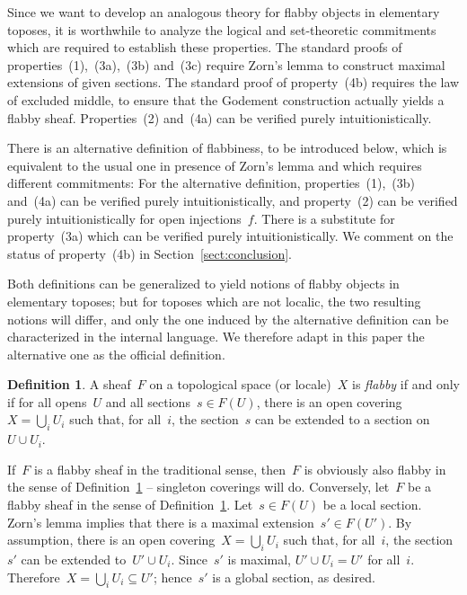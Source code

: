 \documentclass[oneside]{amsart}
\theoremstyle{definition}
\newtheorem{defn}{Definition}[section]
\theoremstyle{plain}
\theoremstyle{remark}
\renewcommand{\_}{\mathpunct{.}\,}
\begin{document}
Since we want to develop an analogous theory for flabby objects in elementary
toposes, it is worthwhile to analyze the logical and set-theoretic commitments
which are required to establish these properties. The standard proofs of
properties~(1),~(3a),~(3b) and~(3c) require Zorn's lemma to construct maximal
extensions of given sections. The standard proof of property~(4b) requires the
law of excluded middle, to ensure that the Godement construction actually
yields a flabby sheaf. Properties~(2) and~(4a) can be verified purely
intuitionistically.

There is an alternative definition of flabbiness, to be introduced below, which
is equivalent to the usual one in presence of Zorn's lemma and which
requires different commitments: For the alternative definition,
properties~(1),~(3b) and~(4a) can be verified purely intuitionistically, and
property~(2) can be verified purely intuitionistically for open injections~$f$.
There is a substitute for property~(3a) which can be verified purely
intuitionistically. We comment on the status of property~(4b) in
Section~\ref{sect:conclusion}.

Both definitions can be generalized to yield notions of flabby objects in
elementary toposes; but for toposes which are not localic, the two resulting
notions will differ, and only the one induced by the alternative definition
can be characterized in the internal language. We therefore adapt in this paper the
alternative one as the official definition.

\begin{defn}\label{defn:flabby-sheaf}
A sheaf~$F$ on a topological space (or locale)~$X$ is \emph{flabby}
if and only if for all opens~$U$ and all sections~$s \in F(U)$, there is an
open covering~$X = \bigcup_i U_i$ such that, for all~$i$, the section~$s$ can
be extended to a section on~$U \cup U_i$.\end{defn}

If~$F$ is a flabby sheaf in the traditional sense, then~$F$ is obviously also
flabby in the sense of Definition~\ref{defn:flabby-sheaf} -- singleton
coverings will do. Conversely, let~$F$ be a flabby sheaf in the sense of
Definition~\ref{defn:flabby-sheaf}. Let~$s \in F(U)$ be a local section. Zorn's
lemma implies that there is a maximal extension~$s' \in F(U')$. By assumption,
there is an open covering~$X = \bigcup_i U_i$ such that, for all~$i$, the
section~$s'$ can be extended to~$U' \cup U_i$. Since~$s'$ is maximal, $U' \cup
U_i = U'$ for all~$i$. Therefore~$X = \bigcup_i U_i \subseteq U'$; hence~$s'$ is a
global section, as desired.
\end{document}
